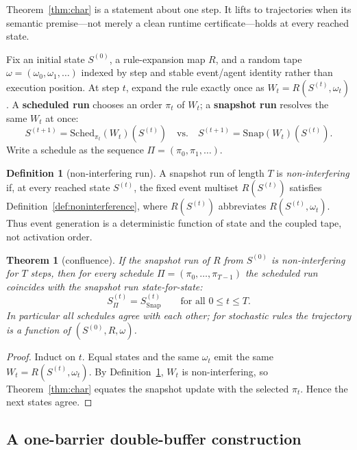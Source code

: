 \documentclass[sigconf,nonacm,review,natbib=true]{acmart}
\newtheorem{theorem}{Theorem}
\theoremstyle{definition}
\newtheorem{definition}{Definition}
\theoremstyle{plain}
\theoremstyle{remark}
\begin{document}
Theorem~\ref{thm:char} is a statement about one step. It lifts to trajectories
when its semantic premise---not merely a clean runtime certificate---holds at
every reached state.

Fix an initial state $S^{(0)}$, a rule-expansion map $R$, and a random tape
$\omega=(\omega_0,\omega_1,\ldots)$ indexed by step and stable event/agent
identity rather than execution position. At step $t$, expand the rule exactly
once as $W_t=R(S^{(t)},\omega_t)$. A \textbf{scheduled run} chooses an order
$\pi_t$ of $W_t$; a \textbf{snapshot run} resolves the same $W_t$ at once:
\[
S^{(t+1)}=\mathrm{Sched}_{\pi_t}(W_t)(S^{(t)})
\quad\text{vs.}\quad
S^{(t+1)}=\mathrm{Snap}(W_t)(S^{(t)}).
\]
Write a schedule as the sequence $\Pi=(\pi_0,\pi_1,\dots)$.

\begin{definition}[non-interfering run]\label{def:noninterfering-run}
A snapshot run of length $T$ is \emph{non-interfering} if, at every reached
state $S^{(t)}$, the fixed event multiset $R(S^{(t)})$ satisfies
Definition~\ref{def:noninterference}, where $R(S^{(t)})$ abbreviates
$R(S^{(t)},\omega_t)$. Thus event generation is a deterministic function of
state and the coupled tape, not activation order.
\end{definition}

\begin{theorem}[confluence]\label{thm:conf}
If the snapshot run of $R$ from $S^{(0)}$ is non-interfering for $T$ steps,
then for every schedule $\Pi=(\pi_0,\dots,\pi_{T-1})$ the scheduled run
coincides with the snapshot run state-for-state: \[
S^{(t)}_{\Pi}=S^{(t)}_{\mathrm{Snap}}\qquad\text{for all } 0\le t\le T .
\] In particular all schedules agree with each other; for stochastic rules the
trajectory is a function of $(S^{(0)},R,\omega)$.

\end{theorem}

\begin{proof} Induct on $t$. Equal states and the same $\omega_t$ emit the same
$W_t=R(S^{(t)},\omega_t)$. By
Definition~\ref{def:noninterfering-run}, $W_t$ is non-interfering, so
Theorem~\ref{thm:char} equates the snapshot update with the selected
$\pi_t$. Hence the next states agree.\end{proof}
 
\subsection{A one-barrier double-buffer construction}\label{ax:stage}
\end{document}
